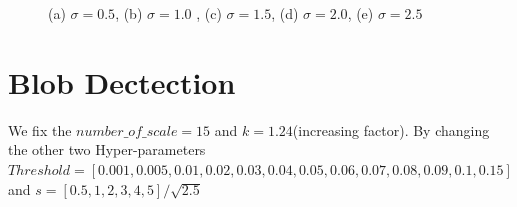 \documentclass[final]{cvpr}
\begin{document}
\begin{appendices}
\begin{figure}[htbp]
{  }
  \quad
  \caption{(a) $\sigma=0.5$, (b) $\sigma=1.0$ , (c) $\sigma=1.5$, (d) $\sigma=2.0$, (e) $\sigma=2.5$}
  \label{fig: logsig}
  \end{figure}

\section{Blob Dectection}\label{sec: allblob}
We fix the $number\_of\_scale=15$ and $k=1.24$(increasing factor). By changing the other two Hyper-parameters $Threshold=[0.001,0.005,0.01,0.02,0.03,0.04,0.05,0.06,0.07,0.08,0.09,0.1,0.15]$ and $s=[0.5,1,2,3,4,5]/\sqrt{2.5}$


\end{appendices}
\end{document}

